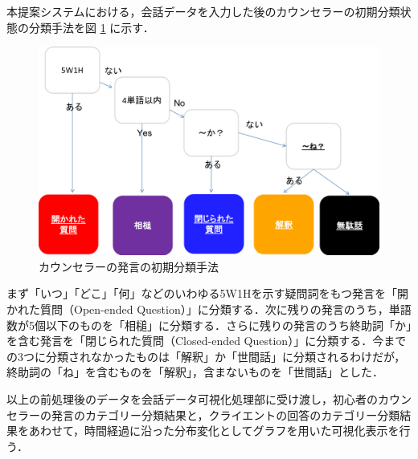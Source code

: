 \documentclass[shuuron]{kuee}
\begin{document}
本提案システムにおける，会話データを入力した後のカウンセラーの初期分類状態の分類手法を図
\ref{fig:5_2}
に示す．
\begin{figure}
  \begin{center}
    \includegraphics[width=\linewidth]{5_2.png}
  \end{center}
  \caption{カウンセラーの発言の初期分類手法}
  \label{fig:5_2}
\end{figure}
まず「いつ」「どこ」「何」などのいわゆる5W1Hを示す疑問詞をもつ発言を「開かれた質問（Open-ended Question）」に分類する．次に残りの発言のうち，単語数が5個以下のものを「相槌」に分類する．さらに残りの発言のうち終助詞「か」を含む発言を「閉じられた質問（Closed-ended Question）」に分類する．今までの3つに分類されなかったものは「解釈」か「世間話」に分類されるわけだが，終助詞の「ね」を含むものを「解釈」，含まないものを「世間話」とした．




以上の前処理後のデータを会話データ可視化処理部に受け渡し，初心者のカウンセラーの発言のカテゴリー分類結果と，クライエントの回答のカテゴリー分類結果をあわせて，時間経過に沿った分布変化としてグラフを用いた可視化表示を行う．










\end{document}
